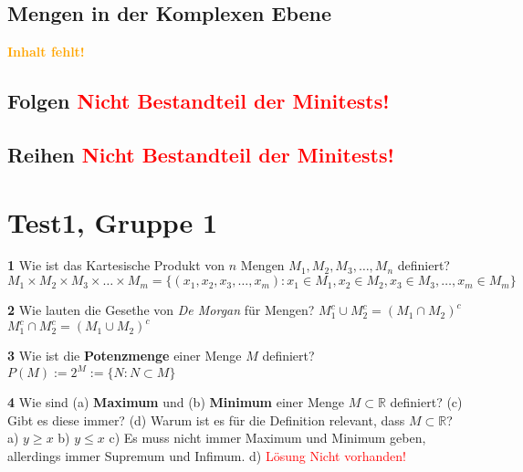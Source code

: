\documentclass[11pt]{article}
\begin{document}
    \subsection{Mengen in der Komplexen Ebene}
    \textcolor{orange}{\textbf{Inhalt fehlt!}}

    \subsection{Folgen \textcolor{red}{\textbf{Nicht Bestandteil der Minitests!}}}

    \subsection{Reihen \textcolor{red}{\textbf{Nicht Bestandteil der Minitests!}}}

\section{Test1, Gruppe 1}

    \textbf{1} Wie ist das Kartesische Produkt von $n$ Mengen $M_1, M_2, M_3, \dots, M_n$ definiert?\newline
    $M_1 \times M_2 \times M_3 \times \ldots \times M_m = \{ (x_1, x_2, x_3, \ldots, x_m) : x_1 \in M_1, x_2 \in M_2, x_3 \in M_3, \ldots, x_m \in M_m \}$\newline

    \textbf{2} Wie lauten die Gesethe von {\itshape De Morgan} für Mengen?\newline
    $M_1^c \cup M_2^c = (M_1 \cap M_2)^c$\newline
    $M_1^c \cap M_2^c = (M_1 \cup M_2)^c$\newline


    \textbf{3} Wie ist die \textbf{Potenzmenge} einer Menge $M$ definiert?\newline
    $P(M) := 2^M := \{ N : N \subset M \}$\newline

    \textbf{4} Wie sind (a) \textbf{Maximum} und (b) \textbf{Minimum} einer Menge $M \subset \mathbb{R}$ definiert? (c) Gibt es diese immer? (d) Warum ist es für die Definition relevant, dass $M \subset \mathbb{R}$?\newline
    a) $y \geq x$\newline
    b) $y \leq x$\newline
    c) Es muss nicht immer Maximum und Minimum geben, allerdings immer Supremum und Infimum.\newline
    d) \textcolor{red}{Lösung Nicht vorhanden!}\newline
\end{document}
